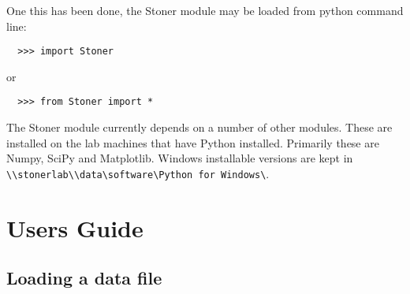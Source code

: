 \documentclass[a4paper,11pt]{scrartcl}
\begin{document}
One this has been done, the Stoner module may be loaded from python command line:

\begin{verbatim}
  >>> import Stoner
\end{verbatim}

or

\begin{verbatim}
  >>> from Stoner import *
\end{verbatim}

The Stoner module currently depends on a number of other modules. These are installed on the lab machines that have Python installed. Primarily these are Numpy, SciPy and Matplotlib. Windows installable versions are kept in \\ \verb#\\stonerlab\\data\software\Python for Windows\#.

\section{Users Guide}
\subsection{Loading a data file}
\end{document}
